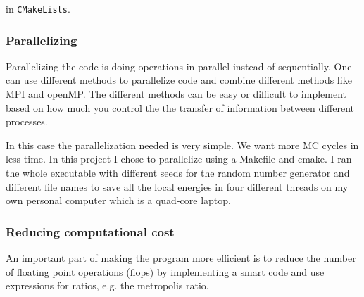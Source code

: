 in \texttt{CMakeLists}.

\subsubsection{Parallelizing}

Parallelizing the code is doing operations in parallel instead of sequentially. One can use different methods to parallelize code and combine different methods like MPI and openMP. The different methods can be easy or difficult to implement based on how much you control the the transfer of information between different processes. 

In this case the parallelization needed is very simple. We want more MC cycles in less time. In this project I chose to parallelize using a Makefile and cmake. I ran the whole executable with different seeds for the random number generator and different file names to save all the local energies in four different threads on my own personal computer which is a quad-core laptop.

\subsubsection{Reducing computational cost}

An important part of making the program more efficient is to reduce the number of floating point operations (flops) by implementing a smart code and use expressions for ratios, e.g. the metropolis ratio. 

